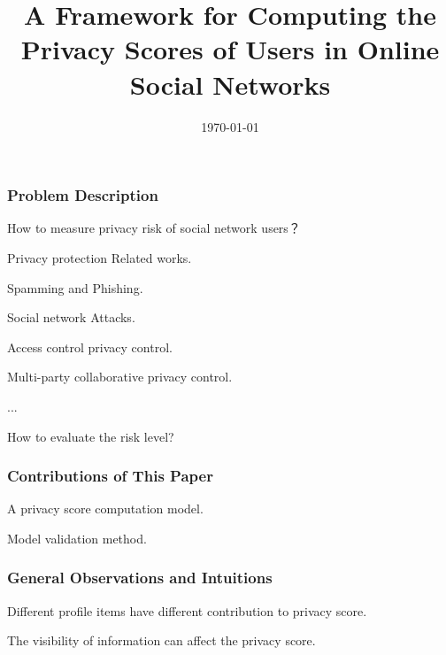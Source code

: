\documentclass{beamer}
\title[Online Social Network Privacy]{A Framework for Computing the
  Privacy Scores of Users in Online Social Networks}
\date{\today}
\begin{document}
\begin{frame}
  \titlepage
\end{frame}

\begin{frame}
  \frametitle{Problem Description}
  \begin{block}
    {How to measure privacy risk of social network users？}
    \begin{itemize}
      \LARGE{
    \item Privacy protection Related works. 
      \begin{itemize}
        \Large{
      \item Spamming and Phishing.
      \item Social network Attacks. 
      \item Access control privacy control.
      \item Multi-party collaborative privacy control. 
      \item ...}
      \end{itemize}
    \item How to evaluate the risk level? }
    \end{itemize}
  \end{block}
\end{frame}

\begin{frame}
  \frametitle{Contributions of This Paper}
    \begin{itemize} 
      \LARGE{
      \item A privacy score computation model. 
      \item Model validation method. }
    \end{itemize}
\end{frame}

\begin{frame}%
  \frametitle{General Observations and Intuitions}
  \begin{itemize}
    \LARGE{
    \item Different profile items have different contribution to
      privacy score. 
    \item The visibility of information can affect the privacy score.}
  \end{itemize}
\end{frame}
\end{document}
